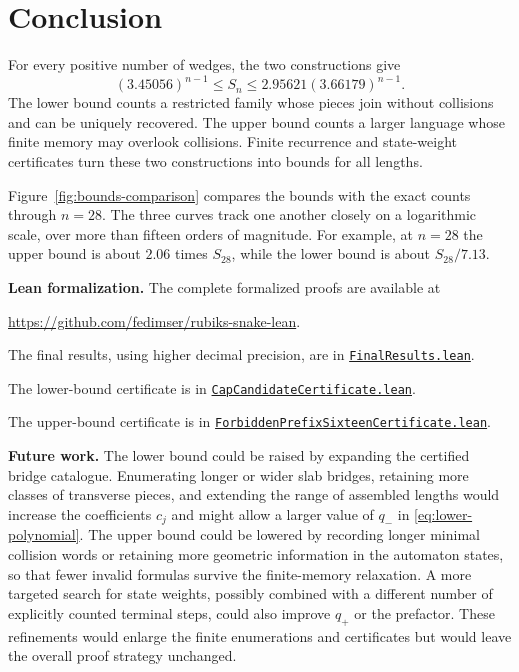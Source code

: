 \documentclass[11pt]{article}
\newcommand{\qminus}{q_-}
\newcommand{\qplus}{q_+}
\begin{document}
\section{Conclusion}

For every positive number of wedges, the two constructions give
\begin{equation}\label{eq:pointwise-bounds}
 \boxed{(3.45056)^{n-1}\leq S_n\leq
 2.95621(3.66179)^{n-1}.}
\end{equation}
The lower bound counts a restricted family whose pieces join
without collisions and can be uniquely recovered. The upper
bound counts a larger language whose finite memory may overlook
collisions. Finite recurrence and state-weight certificates turn
these two constructions into bounds for all lengths.

Figure~\ref{fig:bounds-comparison} compares the bounds with the exact
counts through $n=28$. The three curves track one another closely
on a logarithmic scale, over more than fifteen orders of magnitude.
For example, at $n=28$ the upper bound is about $2.06$ times $S_{28}$,
while the lower bound is about $S_{28}/7.13$.

\textbf{Lean formalization.} The complete formalized proofs are available at
\begin{center}
 \url{https://github.com/fedimser/rubiks-snake-lean}.
\end{center}

The final results, using higher decimal precision, are in
\href{https://github.com/fedimser/rubiks-snake-lean/blob/master/lean/RubiksSnake/SnAsymptotic/FinalResults.lean}
{\texttt{FinalResults.lean}}.

The lower-bound certificate is in
\href{https://github.com/fedimser/rubiks-snake-lean/blob/master/lean/RubiksSnake/SnAsymptotic/CapCandidateCertificate.lean}
{\texttt{CapCandidateCertificate.lean}}.

The upper-bound certificate is in
\href{https://github.com/fedimser/rubiks-snake-lean/blob/master/lean/RubiksSnake/SnAsymptotic/ForbiddenPrefixSixteenCertificate.lean}
{\texttt{ForbiddenPrefixSixteenCertificate.lean}}.

\textbf{Future work.}
The lower bound could be raised by expanding the certified bridge
catalogue. Enumerating longer or wider slab bridges, retaining more
classes of transverse pieces, and extending the range of assembled
lengths would increase the coefficients $c_j$ and might allow a larger
value of $\qminus$ in \eqref{eq:lower-polynomial}. The upper bound could
be lowered by recording longer minimal collision words or retaining
more geometric information in the automaton states, so that fewer
invalid formulas survive the finite-memory relaxation. A more targeted
search for state weights, possibly combined with a different number of
explicitly counted terminal steps, could also improve $\qplus$ or the
prefactor. These refinements would enlarge the finite enumerations and
certificates but would leave the overall proof strategy unchanged.
\end{document}
